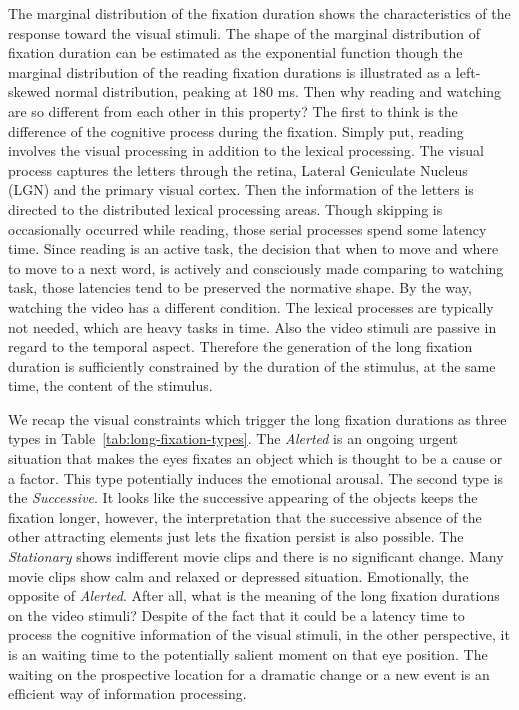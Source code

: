 \documentclass[oneside,master]{snueethesis}
\begin{document}
The marginal distribution of the fixation duration shows the characteristics of the response toward the visual stimuli. The shape of the marginal distribution of fixation duration can be estimated as the exponential function though the marginal distribution of the reading fixation durations is illustrated as a left-skewed normal distribution, peaking at 180 ms. Then why reading and watching are so different from each other in this property? The first to think is the difference of the cognitive process during the fixation. Simply put, reading involves the visual processing in addition to the lexical processing. The visual process captures the letters through the retina, Lateral Geniculate Nucleus (LGN) and the primary visual cortex. Then the information of the letters is directed to the distributed lexical processing areas. Though skipping is occasionally occurred while reading, those serial processes spend some latency time. Since reading is an active task, the decision that when to move and where to move to a next word, is actively and consciously made comparing to watching task, those latencies tend to be preserved the normative shape. By the way, watching the video has a different condition. The lexical processes are typically not needed, which are heavy tasks in time. Also the video stimuli are passive in regard to the temporal aspect. Therefore the generation of the long fixation duration is sufficiently constrained by the duration of the stimulus, at the same time, the content of the stimulus. 

We recap the visual constraints which trigger the long fixation durations as three types in Table~\ref{tab:long-fixation-types}. The \textit{Alerted} is an ongoing urgent situation that makes the eyes fixates an object which is thought to be a cause or a factor. This type potentially induces the emotional arousal. The second type is the \textit{Successive}. It looks like the successive appearing of the objects keeps the fixation longer, however, the interpretation that the successive absence of the other attracting elements just lets the fixation persist is also possible. The \textit{Stationary} shows indifferent movie clips and there is no significant change. Many movie clips show calm and relaxed or depressed situation. Emotionally, the opposite of \textit{Alerted}. After all, what is the meaning of the long fixation durations on the video stimuli? Despite of the fact that it could be a latency time to process the cognitive information of the visual stimuli, in the other perspective, it is an waiting time to the potentially salient moment on that eye position. The waiting on the prospective location for a dramatic change or a new event is an efficient way of information processing.
\end{document}
